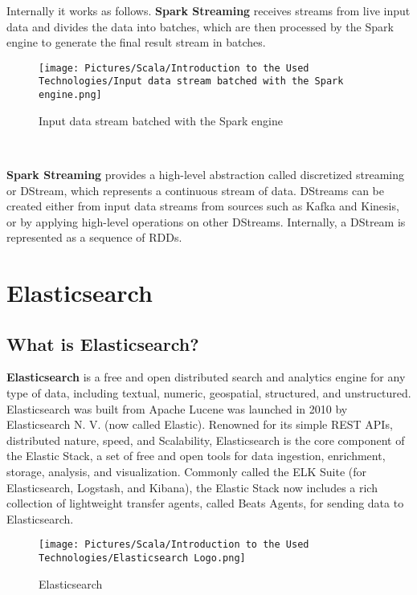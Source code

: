 \begin{spacing}{1.5}
\par Internally it works as follows. \textbf{Spark Streaming} receives streams from live input data and divides the data into batches, which are then processed by the Spark engine to generate the final result stream in batches.
\\
\begin{figure}[!htb] 
\begin{center} 
\texttt{[image: Pictures/Scala/Introduction to the Used Technologies/Input data stream batched with the Spark engine.png]}
\end{center} 
\caption{Input data stream batched with the Spark engine} 
\end{figure}  \FloatBarrier
\\
\par \textbf{Spark Streaming} provides a high-level abstraction called discretized streaming or DStream, which represents a continuous stream of data. DStreams can be created either from input data streams from sources such as Kafka and Kinesis, or by applying high-level operations on other DStreams. Internally, a DStream is represented as a sequence of RDDs.
\newpage

\section{Elasticsearch} 
 \subsection{What is Elasticsearch?}
 \par  \textbf{Elasticsearch} is a free and open distributed search and analytics engine for any type of data, including textual, numeric, geospatial, structured, and unstructured. Elasticsearch was built from
Apache Lucene was launched in 2010 by Elasticsearch N. V. (now called Elastic). Renowned for its simple REST APIs, distributed nature, speed, and Scalability, Elasticsearch is the core component of the Elastic Stack, a set of free and open tools for data ingestion, enrichment,
storage, analysis, and visualization. Commonly called the ELK Suite (for Elasticsearch, Logstash, and Kibana), the Elastic Stack now includes a rich collection of lightweight transfer agents, called Beats Agents, for sending data to Elasticsearch.
 
\begin{figure}[!htb] 
\begin{center} 
\texttt{[image: Pictures/Scala/Introduction to the Used Technologies/Elasticsearch Logo.png]}
\end{center} 
\caption{Elasticsearch} 
\end{figure}  \FloatBarrier
\\


\end{spacing}
